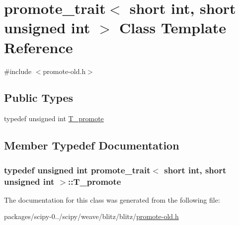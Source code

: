 \hypertarget{classpromote__trait_3_01short_01int_00_01short_01unsigned_01int_01_4}{}\section{promote\+\_\+trait$<$ short int, short unsigned int $>$ Class Template Reference}
\label{classpromote__trait_3_01short_01int_00_01short_01unsigned_01int_01_4}


{\ttfamily \#include $<$promote-\/old.\+h$>$}

\subsection*{Public Types}
\begin{DoxyCompactItemize}
\item 
typedef unsigned int \hyperlink{classpromote__trait_3_01short_01int_00_01short_01unsigned_01int_01_4_a245ca2432a5569637925b061239b028f}{T\+\_\+promote}
\end{DoxyCompactItemize}


\subsection{Member Typedef Documentation}
\hypertarget{classpromote__trait_3_01short_01int_00_01short_01unsigned_01int_01_4_a245ca2432a5569637925b061239b028f}{}
\subsubsection[{T\+\_\+promote}]{\setlength{\rightskip}{0pt plus 5cm}typedef unsigned int {\bf promote\+\_\+trait}$<$ short int, short unsigned int $>$\+::{\bf T\+\_\+promote}}\label{classpromote__trait_3_01short_01int_00_01short_01unsigned_01int_01_4_a245ca2432a5569637925b061239b028f}


The documentation for this class was generated from the following file\+:\begin{DoxyCompactItemize}
\item 
packages/scipy-\/0../scipy/weave/blitz/blitz/\hyperlink{promote-old_8h}{promote-\/old.\+h}\end{DoxyCompactItemize}
